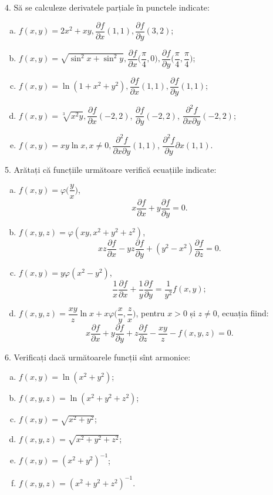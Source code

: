 4. Să se calculeze derivatele parțiale în punctele indicate:
\begin{enumerate}[(a)]
\item $ f(x, y) = 2x^2 + xy, \dfrac{\partial f}{\partial x}(1, 1), %
  \dfrac{\partial f}{\partial y} (3, 2) $;
\item $ f(x, y) = \sqrt{\sin^2 x + \sin^2 y}, \dfrac{\partial f}{\partial x} %
  \Big( \dfrac{\pi}{4}, 0 \Big), \dfrac{\partial f}{\partial y} %
  \Big( \dfrac{\pi}{4}, \dfrac{\pi}{4} \Big) $;
\item $ f(x, y) = \ln(1 + x^2 + y^2), \dfrac{\partial f}{\partial x}(1, 1), %
  \dfrac{\partial f}{\partial y}(1, 1) $;
\item $ f(x, y) = \sqrt[3]{x^2 y}, \dfrac{\partial f}{\partial x}(-2, 2) $,
  $ \dfrac{\partial f}{\partial y}(-2, 2) $, $\dfrac{\partial^2 f}{\partial x\partial y}(-2, 2) $;
\item $ f(x, y) = xy\ln x, x \neq 0, \dfrac{\partial^2 f}{\partial x\partial y}(1, 1) $,
  $ \dfrac{\partial^2 f}{\partial y}{\partial x}(1, 1) $.
\end{enumerate}

\vspace{0.5cm}

5. Arătați că funcțiile următoare verifică ecuațiile indicate:
\begin{enumerate}[(a)]
\item $ f(x, y) = \varphi \Big( \dfrac{y}{x} \Big) $,
  \[
    x \frac{\partial f}{\partial x} + y \frac{\partial f}{\partial y} = 0.
  \]
\item $ f(x, y, z) = \varphi(xy, x^2 + y^2 + z^2) $,
  \[
    xz \frac{\partial f}{\partial x} - yz \frac{\partial f}{\partial y} + %
    (y^2 - x^2) \frac{\partial f}{\partial z} = 0.
  \]
\item $ f(x, y) = y \varphi(x^2 - y^2) $,
  \[
    \frac{1}{x} \frac{\partial f}{\partial x} + \frac{1}{y} \frac{\partial f}{\partial y} = %
    \frac{1}{y^2} f(x, y);
  \]
\item $ f(x, y, z) = \dfrac{xy}{z} \ln x + x\varphi \Big( \dfrac{x}{y}, \dfrac{z}{x} \Big) $,
  pentru $ x > 0 $ și $ z \neq 0 $, ecuația fiind:
  \[
    x \frac{\partial f}{\partial x} + y \frac{\partial f}{\partial y} + z \frac{\partial f}{\partial z} - %
    \frac{xy}{z} - f(x, y, z) = 0.
  \]
\end{enumerate}

\vspace{0.5cm}

6. Verificați dacă următoarele funcții sînt armonice:
\begin{enumerate}[(a)]
\item $ f(x, y) = \ln(x^2 + y^2) $;
\item $ f(x, y, z) = \ln(x^2 + y^2 + z^2) $;
\item $ f(x, y) = \sqrt{x^2 + y^2} $;
\item $ f(x, y, z) = \sqrt{x^2 + y^2 + z^2} $;
\item $ f(x, y) = (x^2 + y^2)^{-1} $;
\item $ f(x, y, z) = (x^2 + y^2 + z^2)^{-1} $.
\end{enumerate}

